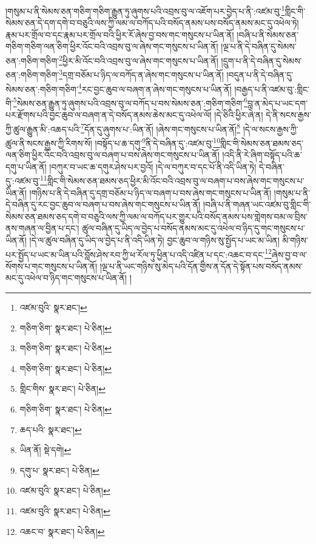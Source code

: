 །གསུམ་པ་ནི་སེམས་ཅན་གཅིག་གཅིག་རྒྱུན་ཏུ་ཞུགས་པའི་འབྲས་བུ་ལ་འཇོག་པར་བྱེད་པ་ནི་:འཛམ་བུ་\footnote{འཛམ་བུའི་  སྣར་ཐང་། }གླིང་གི་སེམས་ཅན་དེ་དག་དགེ་བ་བཅུའི་ལས་ཀྱི་ལམ་ལ་བཀོད་པའི་བསོད་ནམས་པས་བསོད་ནམས་མང་དུ་འཕེལ་ཏེ། རྣམ་པར་གྲོལ་བ་དང་རྣམ་པར་གྲོལ་བའི་ཕྱིར་རོ་ཞེས་བྱ་བས་གང་གསུངས་པ་ཡིན་ནོ། །བཞི་པ་ནི་སེམས་ཅན་གཅིག་གཅིག་ལན་ཅིག་ཕྱིར་འོང་བའི་འབྲས་བུ་ལ་ཞེས་གང་གསུངས་པ་ཡིན་ནོ། །ལྔ་པ་ནི་དེ་བཞིན་དུ་སེམས་ཅན་:གཅིག་གཅིག་\footnote{གཅིག་ཅིག་  སྣར་ཐང་།  པེ་ཅིན། }ཕྱིར་མི་འོང་བའི་འབྲས་བུ་ལ་ཞེས་གང་གསུངས་པ་ཡིན་ནོ། །དྲུག་པ་ནི་དེ་བཞིན་དུ་སེམས་ཅན་:གཅིག་གཅིག་\footnote{གཅིག་ཅིག་  སྣར་ཐང་།  པེ་ཅིན། }དགྲ་བཅོམ་པ་ཉིད་ལ་བཀོད་ན་ཞེས་གང་གསུངས་པ་ཡིན་ནོ། །བདུན་པ་ནི་དེ་བཞིན་དུ་སེམས་ཅན་:གཅིག་གཅིག་\footnote{གཅིག་ཅིག་  སྣར་ཐང་།  པེ་ཅིན། }རང་བྱང་ཆུབ་ལ་བཞག་ན་ཞེས་གང་གསུངས་པ་ཡིན་ནོ། །བརྒྱད་པ་ནི་འཛམ་བུ་:གླིང་གི་\footnote{གླིང་གིས་  སྣར་ཐང་།  པེ་ཅིན། }སེམས་ཅན་རྒྱུན་ཏུ་ཞུགས་པའི་འབྲས་བུ་ལ་བཀོད་པ་བས་སེམས་ཅན་:གཅིག་གཅིག་\footnote{གཅིག་ཅིག་  སྣར་ཐང་།  པེ་ཅིན། }བླ་ན་མེད་པ་ཡང་དག་པར་རྫོགས་པའི་བྱང་ཆུབ་ལ་བཞག་ན་དེ་བསོད་ནམས་ཆེས་མང་དུ་འཕེལ་ལོ། །དེ་ཅིའི་ཕྱིར་ཞེ་ན། དེ་ནི་སངས་རྒྱས་ཀྱི་ཚུལ་རྒྱུན་མི་:འཆད་པའི་\footnote{ཆད་པའི་  སྣར་ཐང་། }དོན་དུ་ཞུགས་པ་:ཡིན་ནོ། །ཞེས་གང་གསུངས་པ་ཡིན་ནོ།\footnote{ཡིན་ནོ།  སྡེ་དགེ། } །དེ་ལ་སངས་རྒྱས་ཀྱི་ཚུལ་ནི་སངས་རྒྱས་ཀྱི་རིགས་སོ། །བསྟོད་པ་ཆ་དགུ་\footnote{དགུ་པ་  སྣར་ཐང་།  པེ་ཅིན། }ནི་དེ་བཞིན་དུ་:འཛམ་བུ་\footnote{འཛམ་བུའི་  སྣར་ཐང་།  པེ་ཅིན། }གླིང་གི་སེམས་ཅན་ཐམས་ཅད་ལན་ཅིག་ཕྱིར་འོང་བའི་འབྲས་བུ་ལ་བཞག་པ་བས་ཞེས་གང་གསུངས་པ་ཡིན་ནོ། །འདི་ནི་རེ་ཞིག་བསྟོད་པའི་ཆ་དགུ་པ་ཡིན་ནོ། །བཀུར་བ་ཡང་ཆ་དགུར་ཤེས་པར་བྱའོ། །དེ་ལ་བཀུར་བ་དང་པོ་ནི་འདི་ཡིན་ཏེ། དེ་བཞིན་དུ་:འཛམ་བུ་\footnote{འཛམ་བུའི་  སྣར་ཐང་།  པེ་ཅིན། }གླིང་གི་སེམས་ཅན་ཐམས་ཅད་ཕྱིར་མི་འོང་བའི་འབྲས་བུ་ལ་བཞག་པ་བས་ཞེས་གང་གསུངས་པ་ཡིན་ནོ། །གཉིས་པ་ནི་དེ་བཞིན་དུ་དགྲ་བཅོམ་པ་ཉིད་ལ་བཞག་པ་བས་ཞེས་གང་གསུངས་པ་ཡིན་ནོ། །གསུམ་པ་ནི་དེ་བཞིན་དུ་རང་བྱང་ཆུབ་ལ་བཞག་པ་བས་ཞེས་གང་གསུངས་པ་ཡིན་ནོ། །བཞི་པ་ནི་གཞན་ཡང་འཛམ་བུ་གླིང་གི་སེམས་ཅན་ཐམས་ཅད་དགེ་བ་བཅུའི་ལས་ཀྱི་ལམ་ལ་བཀོད་པར་གྱུར་པའི་བསོད་ནམས་པས་གླེགས་བམ་ལ་བྲིས་ནས་གཞན་ལ་བྱིན་པ་དང་། ཚུལ་བཞིན་དུ་ཡིད་ལ་བྱེད་པ་བསོད་ནམས་མང་དུ་འཕེལ་བ་ཉིད་དུ་གང་གསུངས་པ་ཡིན་ནོ། །དེ་ལ་ཚུལ་བཞིན་དུ་ཡིད་ལ་བྱེད་པ་ནི་འདི་ཡིན་ཏེ། བྱང་ཆུབ་ལ་གཉིས་སུ་སྤྱོད་པ་ཡང་མ་ཡིན། མི་གཉིས་པར་སྤྱོད་པ་ཡང་མ་ཡིན་པའི་བློས་ཤེས་རབ་ཀྱི་ཕ་རོལ་ཏུ་ཕྱིན་པ་འདི་འཛིན་པ་དང་:འཆང་བ་དང་\footnote{འཆང་བ་  སྣར་ཐང་།  པེ་ཅིན། }ཞེས་བྱ་བ་ལ་སོགས་པ་གང་གསུངས་པ་ཡིན་ནོ། །ལྔ་པ་ནི་ཡང་གཉིས་སུ་མེད་པའི་དོན་གྱིས་ན་དོན་དེ་སྟོན་པས་བསོད་ནམས་མང་དུ་འཕེལ་བ་ཉིད་གང་གསུངས་པ་ཡིན་ནོ། །
